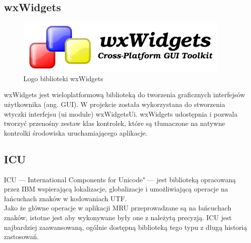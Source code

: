 

\subsection{wxWidgets}
\begin{figure}
\begin{center}
\includegraphics[scale=0.50]{img/wxwidgets_logo.png}
\end{center}
\caption{Logo biblioteki wxWidgets}
\end{figure}

\par
wxWidgets jest wieloplatformową biblioteką do tworzenia graficznych interfejsów użytkownika (ang. GUI). W projekcie została wykorzystana do stworzenia wtyczki interfejsu (ui module) wxWidgetsUi. wxWidgets udostępnia i pozwala tworzyć przenośny zestaw klas kontrolek, które są tłumaczone na natywne kontrolki środowiska uruchamiającego aplikacje.

\subsection{ICU}
\par
ICU --- International Components for Unicode" --- jest biblioteką opracowaną przez IBM wspierającą lokalizacje, globalizacje i umożliwiającą operacje na łańcuchach znaków w kodowaniach UTF.\\
Jako że główne operacje w aplikacji MRU przeprowadzane są na łańcuchach znaków, istotne jest aby wykonywane były one z należytą precyzją. ICU jest najbardziej zaawansowaną, ogólnie dostępną biblioteką tego typu z długą historią zastosowań.

